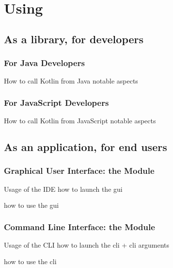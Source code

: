 \documentclass[handout]{beamer}
\begin{document}
\section{Using \twopkt}

\subsection{As a library, for developers}

\subsubsection{For Java Developers}

\begin{frame}[allowframebreaks]{How to call Kotlin from Java}
    notable aspects
\end{frame}

\subsubsection{For JavaScript Developers}

\begin{frame}[allowframebreaks]{How to call Kotlin from JavaScript}
    notable aspects
\end{frame}

\subsection{As an application, for end users}

\subsubsection{Graphical User Interface: the  Module}

\begin{frame}[allowframebreaks]{Usage of the IDE}
    how to launch the gui

    how to use the gui
\end{frame}

\subsubsection{Command Line Interface: the  Module}

\begin{frame}[allowframebreaks]{Usage of the CLI}
    how to launch the cli
        + cli arguments

    how to use the cli
\end{frame}
\end{document}
